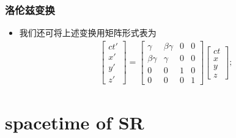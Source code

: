 \documentclass[aspectratio=169, 10pt, utf8, mathserif]{beamer}
\def\hilite<#1>{\temporal<#1>{\color{blue!80}}{\color{blue!85!white}}{\color{black}}}%
\numberwithin{equation}{section} %
\numberwithin{figure}{section} %
\begin{document}
\begin{frame}
\frametitle{\textsc{洛伦兹变换}}
\begin{itemize}


\hilite<1>\item 我们还可将上述变换用矩阵形式表为
\begin{align}
\left[
\begin{array}{l}
ct'\\x'\\y'\\z'
\end{array}
\right]=
\left[
\begin{array}{cccc}
\gamma&\beta\gamma&0&0\\
\beta\gamma&\gamma&0&0\\
0&0&1&0\\
0&0&0&1
\end{array}
\right]
\left[
\begin{array}{l}
ct\\x\\y\\z
\end{array}
\right];
\end{align}
\end{itemize}

\end{frame}


\section[狭义相对论的时空观]{spacetime of SR}

\end{document}
